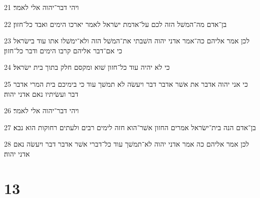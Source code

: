 \par 21 ויהי דבר־יהוה אלי לאמר׃
\par 22 בן־אדם מה־המשׁל הזה לכם על־אדמת ישׂראל לאמר יארכו הימים ואבד כל־חזון׃
\par 23 לכן אמר אליהם כה־אמר אדני יהוה השׁבתי את־המשׁל הזה ולא־ימשׁלו אתו עוד בישׂראל כי אם־דבר אליהם קרבו הימים ודבר כל־חזון׃
\par 24 כי לא יהיה עוד כל־חזון שׁוא ומקסם חלק בתוך בית ישׂראל׃
\par 25 כי אני יהוה אדבר את אשׁר אדבר דבר ויעשׂה לא תמשׁך עוד כי בימיכם בית המרי אדבר דבר ועשׂיתיו נאם אדני יהוה׃
\par 26 ויהי דבר־יהוה אלי לאמר׃
\par 27 בן־אדם הנה בית־ישׂראל אמרים החזון אשׁר־הוא חזה לימים רבים ולעתים רחוקות הוא נבא׃
\par 28 לכן אמר אליהם כה אמר אדני יהוה לא־תמשׁך עוד כל־דברי אשׁר אדבר דבר ויעשׂה נאם אדני יהוה׃

\chapter{13}

